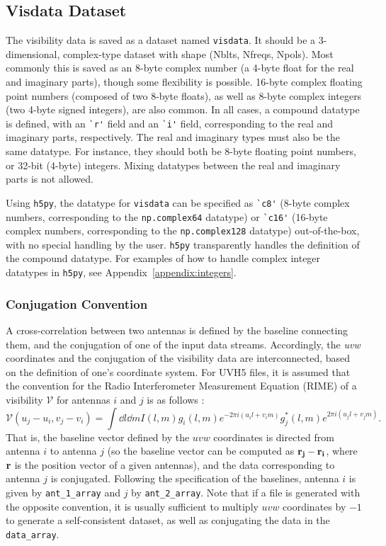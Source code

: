 \documentclass[11pt, oneside]{article}
\begin{document}
\subsection{Visdata Dataset}
\label{sec:visdata}
The visibility data is saved as a dataset named \verb+visdata+. It should be a
3-dimensional, complex-type dataset with shape (Nblts, Nfreqs, Npols). Most
commonly this is saved as an 8-byte complex number (a 4-byte float for the real
and imaginary parts), though some flexibility is possible. 16-byte complex
floating point numbers (composed of two 8-byte floats), as well as 8-byte
complex integers (two 4-byte signed integers), are also common. In all cases, a
compound datatype is defined, with an \verb+`r'+ field and an \verb+`i'+ field,
corresponding to the real and imaginary parts, respectively. The real and
imaginary types must also be the same datatype. For instance, they should both
be 8-byte floating point numbers, or 32-bit (4-byte) integers. Mixing datatypes
between the real and imaginary parts is not allowed.

Using \verb+h5py+, the datatype for \verb+visdata+ can be specified as
\verb+`c8'+ (8-byte complex numbers, corresponding to the \verb+np.complex64+
datatype) or \verb+`c16'+ (16-byte complex numbers, corresponding to the
\verb+np.complex128+ datatype) out-of-the-box, with no special handling by the
user. \verb+h5py+ transparently handles the definition of the compound
datatype. For examples of how to handle complex integer datatypes in
\verb+h5py+, see Appendix~\ref{appendix:integers}.

\subsubsection{Conjugation Convention}
A cross-correlation between two antennas is defined by the baseline connecting
them, and the conjugation of one of the input data streams. Accordingly, the
\textit{uvw} coordinates and the conjugation of the visibility data are
interconnected, based on the definition of one's coordinate system. For UVH5
files, it is assumed that the convention for the Radio Interferometer
Measurement Equation (RIME) of a visibility $\mathcal{V}$ for antennas $i$ and
$j$ is as follows \cite{tms}:
\begin{equation}
\mathcal{V}(u_j - u_i, v_j - v_i) = \int \dd{l} \dd{m} I(l, m) g_i(l, m) e^{-2\pi i (u_i l + v_i m)} g_j^*(l, m) e^{2\pi i (u_j l + v_j m)}.
\end{equation}
That is, the baseline vector defined by the $uvw$ coordinates is directed from
antenna $i$ to antenna $j$ (so the baseline vector can be computed as
$\vb{r_j} - \vb{r_i}$, where $\vb{r}$ is the position vector of a given
antennas), and the data corresponding to antenna $j$ is conjugated. Following
the specification of the baselines, antenna $i$ is given by \verb+ant_1_array+
and $j$ by \verb+ant_2_array+. Note that if a file is generated with the opposite
convention, it is usually sufficient to multiply $uvw$ coordinates by $-1$ to
generate a self-consistent dataset, as well as conjugating the data in the
\verb+data_array+.
\end{document}
